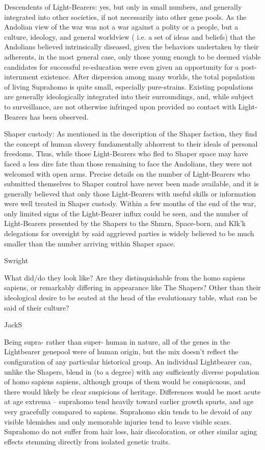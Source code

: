 Descendents of Light-Bearers: yes, but only in small numbers, and
generally integrated into other societies, if not necessarily into
other gene pools. As the Andolian view of the war was not a war
against a polity or a people, but a culture, ideology, and general
worldview ( i.e. a set of ideas and beliefs) that the Andolians
believed intrinsically diseased, given the behaviors undertaken by
their adherents, in the most general case, only those young enough to
be deemed viable candidates for successful re-education were even
given an opportunity for a post-internment existence. After dispersion
among many worlds, the total population of living Suprahomo is quite
small, especially pure-strains. Existing populations are generally
ideologically integrated into their surroundings, and, while subject
to surveillance, are not otherwise infringed upon provided no contact
with Light-Bearers has been observed.

Shaper custody: As mentioned in the description of the Shaper faction,
they find the concept of human slavery fundamentally abhorrent to
their ideals of personal freedoms. Thus, while those Light-Bearers who
fled to Shaper space may have faced a less dire fate than those
remaining to face the Andolians, they were not welcomed with open
arms. Precise details on the number of Light-Bearers who submitted
themselves to Shaper control have never been made available, and it is
generally believed that only those Light-Bearers with useful skills or
information were well treated in Shaper custody. Within a few months
of the end of the war, only limited signs of the Light-Bearer influx
could be seen, and the number of Light-Bearers presented by the
Shapers to the Shmrn, Space-born, and Klk'k delegations for oversight
by said aggrieved parties is widely believed to be much smaller than
the number arriving within Shaper space.

Swright
	
What did/do they look like?  Are they distinquishable from the homo
sapiens sapiens, or remarkably differing in appearance like The
Shapers?  Other than their ideological desire to be seated at the head
of the evolutionary table, what can be said of their culture?

JackS

Being supra- rather than super- human in nature, all of the genes in
the Lightbearer genepool were of human origin, but the mix doesn't
reflect the configuration of any particular historical group. An
individual Lightbearer can, unlike the Shapers, blend in (to a degree)
with any sufficiently diverse population of homo sapiens sapiens,
although groups of them would be conspicuous, and there would likely
be clear suspicions of heritage. Differences would be most acute at
age extrema -- suprahomo tend heavily toward earlier growth spurts,
and age very gracefully compared to sapiens. Suprahomo skin tends to
be devoid of any visible blemishes and only memorable injuries tend to
leave visible scars. Suprahomo do not suffer from hair loss, hair
discoloration, or other similar aging effects stemming directly from
isolated genetic traits.


